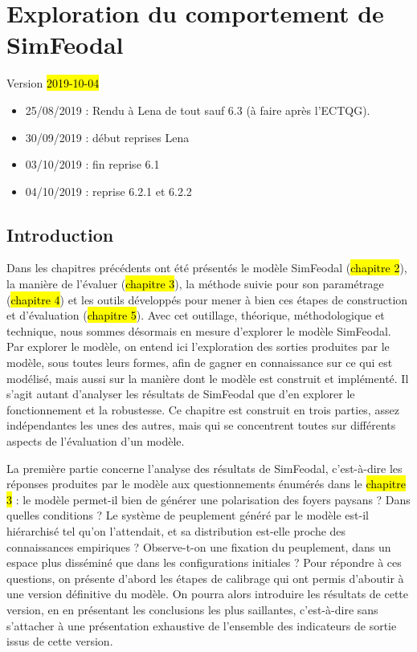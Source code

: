 \chapter{Exploration du comportement de SimFeodal}
\label{chap:chap6}
\begin{center}
	{\large Version \hl{2019-10-04}}
\end{center}

\begin{itemize}
	\item 25/08/2019 : Rendu à Lena de tout sauf 6.3 (à faire après l'ECTQG).
	\item 30/09/2019 : début reprises Lena
	\item 03/10/2019 : fin reprise 6.1
	\item 04/10/2019 : reprise 6.2.1 et 6.2.2
\end{itemize} 

\minitoc

\clearpage
\section*{Introduction}

Dans les chapitres précédents ont été présentés le modèle SimFeodal (\hl{chapitre 2}), la manière de l'évaluer (\hl{chapitre 3}), la méthode suivie pour son paramétrage (\hl{chapitre 4}) et les outils développés pour mener à bien ces étapes de construction et d'évaluation (\hl{chapitre 5}).
Avec cet outillage, théorique, méthodologique et technique, nous sommes désormais en mesure d'explorer le modèle SimFeodal.
Par \og explorer le modèle\fg{}, on entend ici l'exploration des sorties produites par le modèle, sous toutes leurs formes, afin de gagner en connaissance sur ce qui est modélisé, mais aussi sur la manière dont le modèle est construit et implémenté.
Il s'agit autant d'analyser les \og résultats\fg{} de SimFeodal que d'en explorer le fonctionnement et la robustesse.
Ce chapitre est construit en trois parties, assez indépendantes les unes des autres, mais qui se concentrent toutes sur différents aspects de l'évaluation d'un modèle.

La première partie concerne l'analyse des \og résultats\fg{} de SimFeodal, c'est-à-dire les réponses produites par le modèle aux questionnements énumérés dans le \hl{chapitre 3} :
le modèle permet-il bien de générer une polarisation des foyers paysans ? Dans quelles conditions ?
Le système de peuplement généré par le modèle est-il hiérarchisé tel qu'on l'attendait, et sa distribution est-elle proche des connaissances empiriques ?
Observe-t-on une fixation du peuplement, dans un espace plus disséminé que dans les configurations initiales ?
Pour répondre à ces questions, on présente d'abord les étapes de calibrage qui ont permis d'aboutir à une version \og définitive\fg{} du modèle.
On pourra alors introduire les résultats de cette version, en en présentant les conclusions les plus saillantes, c'est-à-dire sans s'attacher à une présentation exhaustive de l'ensemble des indicateurs de sortie issus de cette version.

